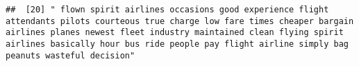 \documentclass[
]{article}
\begin{document}
\begin{verbatim}
##  [20] " flown spirit airlines occasions good experience flight attendants pilots courteous true charge low fare times cheaper bargain airlines planes newest fleet industry maintained clean flying spirit airlines basically hour bus ride people pay flight airline simply bag peanuts wasteful decision"                                                                                                                                                                                                                                                                                                                                                                                                                                                                                                                                                                                                                                                                                                                                                                                                                                                                                                                                                                                                                                                                                                                                                                                                                                                                                                                                                                                                                                                                                           

\end{verbatim}
\end{document}
